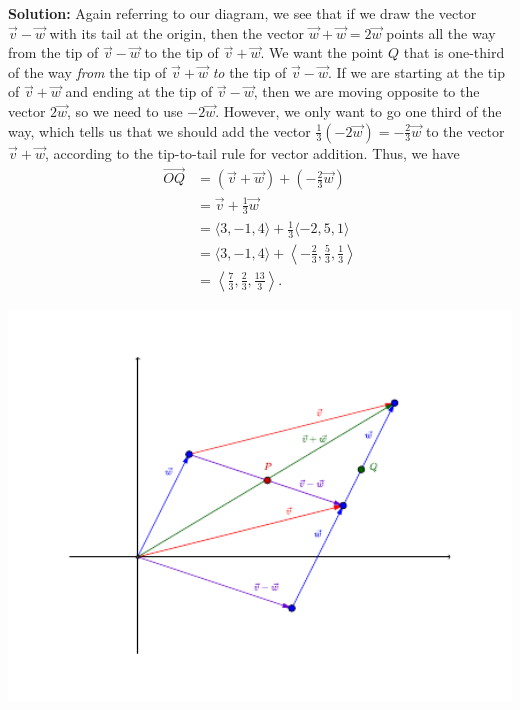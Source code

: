 \documentclass[letterpaper,12pt]{article}
\begin{document}
\begin{enumerate}
\begin{enumerate}
{\bf Solution:} Again referring to our diagram, we see that if we draw the vector $\vec{v}-\vec{w}$ with its tail at the origin, then the vector $\vec{w}+\vec{w} = 2\vec{w}$ points all the way from the tip of $\vec{v}-\vec{w}$ to the tip of $\vec{v}+\vec{w}$. We want the point $Q$ that is one-third of the way {\em from} the tip of $\vec{v}+\vec{w}$ {\em to} the tip of $\vec{v}-\vec{w}$. If we are starting at the tip of $\vec{v}+\vec{w}$ and ending at the tip of $\vec{v}-\vec{w}$, then we are moving opposite to the vector $2\vec{w}$, so we need to use $-2\vec{w}$. However, we only want to go one third of the way, which tells us that we should add the vector $\frac{1}{3}(-2\vec{w}) = -\frac{2}{3}\vec{w}$ to the vector $\vec{v}+\vec{w}$, according to the tip-to-tail rule for vector addition. Thus, we have
\begin{align*}
 \overrightarrow{OQ} & = (\vec{v}+\vec{w})+\left(-\frac{2}{3}\vec{w}\right)\\
& = \vec{v}+\frac{1}{3}\vec{w}\\
& = \langle 3, -1, 4\rangle +\frac{1}{3}\langle -2, 5, 1\rangle\\
& = \langle 3, -1, 4\rangle +\left\langle -\frac{2}{3}, \frac{5}{3}, \frac{1}{3}\right\rangle\\
& = \left\langle \frac{7}{3}, \frac{2}{3}, \frac{13}{3}\right\rangle.
\end{align*}
\begin{center}
 \includegraphics[width=6in]{A1_Q4}
\end{center}


\end{enumerate}

\end{enumerate}
\end{document}
